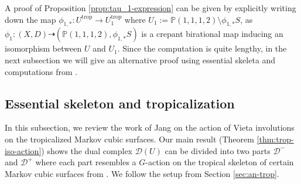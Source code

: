 \documentclass[reqno, 12pt]{amsart}
\theoremstyle{definition}
\newcommand{\bP}{\mathbb{P}}
\newcommand{\cD}{\mathcal{D}}
\newcommand{\trop}{\mathrm{trop}}
\numberwithin{equation}{section}
\begin{document}

A proof of Proposition \ref{prop:tau_1-expression} can be given by explicitly writing down the map $\phi_{1,*}:U^{\trop}\to U_1^{\trop}$ where $U_1:= \bP(1,1,1,2) \setminus \phi_{1,*}S$, as $\phi_1: (X,D) \dashrightarrow (\bP(1,1,1,2), \phi_{1,*}S)$ is a crepant birational map inducing an isomorphism between $U$ and $U_1$. Since the computation is quite lengthy, in the next subsection we will give an alternative proof using essential skeleta and computations from \cite{Jan23}.


\subsection{Essential skeleton and tropicalization}

In this subsection, we review the work of Jang \cite{Jan23} on the action of Vieta involutions on the tropicalized Markov cubic surfaces. Our main result (Theorem \ref{thm:trop-iso-action}) shows the dual complex $\cD(U)$ can be divided into two parts $\cD^{-}$ and $\cD^+$ where each part resembles a $G$-action on the tropical skeleton of certain Markov cubic surfaces from \cite{Jan23}. We  follow the setup from Section \ref{sec:an-trop}.
\end{document}
